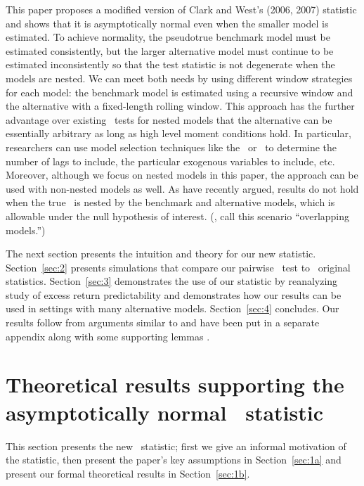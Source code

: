 \documentclass[12pt,fleqn]{article}
\begin{document}
This paper proposes a modified version of Clark and West's (2006,
2007) statistic and shows that it is
asymptotically normal even when the smaller model is estimated.  To
achieve normality, the pseudotrue benchmark model must be estimated
consistently, but the larger alternative model must continue to be
estimated inconsistently so that the test statistic is not degenerate
when the models are nested. We can meet both needs by
using different window strategies for each model: the benchmark model
is estimated using a recursive window and the alternative with a
fixed-length rolling window.
This approach has the further advantage over existing \oos\ tests for
nested models that the alternative can be essentially arbitrary as
long as high level moment conditions hold. In particular, researchers
can use model selection techniques like the \aic\ or \bic\ to
determine the number of lags to include, the particular exogenous
variables to include, etc. Moreover, although we focus on nested
models in this paper, the approach can be used with non-nested models
as well. As \citet{ClM:11b} have recently argued,
 results do not hold when the true \dgp\ is nested by
the benchmark and alternative models, which is allowable under the
null hypothesis of interest. (\citealp{ClM:11b}, call this scenario ``overlapping models.'')

The next section presents the intuition and theory for our new
statistic.  Section~\ref{sec:2} presents simulations that compare our
pairwise \oos\ test to \poscw\ original statistics.
Section~\ref{sec:3} demonstrates the use of our statistic by
reanalyzing  study of excess return predictability and
demonstrates how our results can be used in settings with many
alternative models. Section~\ref{sec:4} concludes. Our results follow
from arguments similar to  and have been put in a
separate appendix along with some supporting lemmas \citep{Cal:15b}.

\section[Asymptotic normality]{Theoretical results supporting the asymptotically normal \oos\ statistic}
\label{sec:1}

This section presents the new \oos\ statistic; first we give an
informal motivation of the statistic, then present the paper's key
assumptions in Section~\ref{sec:1a} and present our formal theoretical
results in Section~\ref{sec:1b}.
\end{document}
